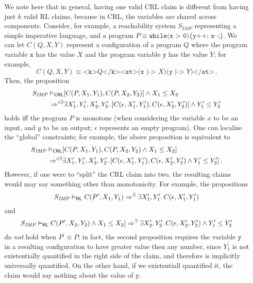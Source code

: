 We note here that in general, having one valid CRL claim is different from having just $k$ valid RL claims,
because in CRL, the variables are shared across components.
Consider, for example, a reachability system $S_{\mathit{IMP}}$ representing a simple imperative language,
and a program $P \equiv \texttt{while(x > 0)\{ y++; x--;\}}$.
We can let $C(Q, X,Y)$ represent a configuration of a program $Q$ where the program variable $\texttt{x}$ has the value $X$
and the program variable $\texttt{y}$ has the value $Y$;
for example,
\begin{equation*}
 C(Q, X, Y) \equiv \texttt{<k>} Q \texttt{</k><st>(x |-> } X \texttt{)(y |-> } Y \texttt{)</st>}    \, .
\end{equation*}
Then, the proposition
\begin{align*}
 S_{\mathit{IMP}} \vDash_{\mathsf{CRL}}
&[C(P, X_1, Y_1),C(P, X_2, Y_2)] \land X_1 \leq X_2
\\ \Rightarrow^{c\exists} &
\exists X^\prime_1, Y^\prime_1, X^\prime_2, Y^\prime_2.\,  [C(\epsilon, X^\prime_1, Y^\prime_1), C(\epsilon, X^\prime_2, Y^\prime_2)] \land Y^\prime_1 \leq Y^\prime_2   
\end{align*}
holds iff the program $P$ is monotone (when considering the variable $x$ to be an input, and $y$ to be an output; $\epsilon$ represents an empty program).
One can localize the ``global'' constraints; for example, the above proposition is equivalent to
\begin{align*}
 S_{\mathit{IMP}} \vDash_{\mathsf{CRL}}
&[C(P, X_1, Y_1),C(P, X_2, Y_2) \land X_1 \leq X_2] 
\\ \Rightarrow^{c\exists} &
\exists X^\prime_1, Y^\prime_1, X^\prime_2, Y^\prime_2.\, [C(\epsilon, X^\prime_1, Y^\prime_1), C(\epsilon, X^\prime_2, Y^\prime_2) \land Y^\prime_1 \leq Y^\prime_2] \, .
\end{align*}
However, if one were to ``split'' the CRL claim into two, the resulting claims would may say something other than monotonicity.
For example, the propositions
\begin{align*}
 S_{\mathit{IMP}} \vDash_{\mathsf{RL}}
C(P^\prime, X_1, Y_1)
\Rightarrow^{\exists}
\exists X^\prime_1, Y^\prime_1.\, C(\epsilon, X^\prime_1, Y^\prime_1)
\end{align*}
and
\begin{align*}
 S_{\mathit{IMP}} \vDash_{\mathsf{RL}}
C(P^\prime, X_2, Y_2) \land X_1 \leq X_2] 
 \Rightarrow^{\exists}
\exists X^\prime_2, Y^\prime_2.\, C(\epsilon, X^\prime_2, Y^\prime_2) \land Y^\prime_1 \leq Y^\prime_2
\end{align*}
do \emph{not} hold when $P^\prime \equiv P$: in fact, the second proposition requires the variable $\texttt{y}$ in a resulting configuration
to have greater value then any number, since $Y_1^\prime$ is not existentially quantified in the right side of the claim,
and therefore is implicitly universally quantified.
On the other hand, if we existentiall quantified it, the claim would say nothing about the value of $\texttt{y}$.

